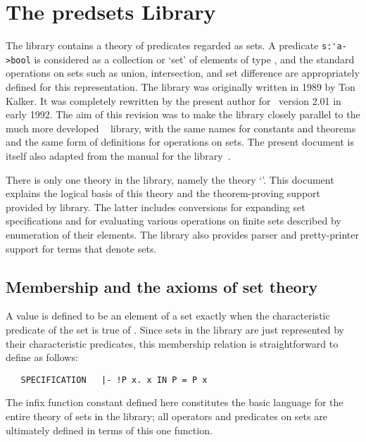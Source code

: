 \chapter{The pred{\und}sets Library}

The  library contains a theory of predicates regarded as sets.
A predicate {\small\verb!s:'a->bool!} is considered as a collection or `set' of
elements of type , and the standard operations on sets such as union,
intersection, and set difference are appropriately defined for this
representation.  The library was originally written in 1989 by Ton Kalker.  It
was completely rewritten by the present author for \HOL\ version 2.01 in early
1992.  The aim of this revision was to make the  library closely
parallel to the much more developed \HOL\  library, with the same
names for constants and theorems and the same form of definitions for
operations on sets.  The present document is itself also adapted from the
manual for the  library~\cite{melham}.

There is only one theory in the  library, namely the theory
`'. This document explains the logical basis of this theory and
the theorem-proving support provided by library.  The latter includes
conversions for expanding set specifications and for evaluating various
operations on finite sets described by enumeration of their elements.  The
library also provides parser and pretty-printer support for terms that denote
sets.

\section{Membership and the axioms of set theory}

A value  is defined to be an element of a set exactly when the
characteristic predicate of the set is true of . Since sets in the
 library are just represented by their characteristic
predicates, this membership relation is straightforward to define as follows:

\begin{hol}
\begin{verbatim}
   SPECIFICATION   |- !P x. x IN P = P x
\end{verbatim}\end{hol}

\noindent The infix function constant  defined here constitutes the
basic language for the entire theory of sets in the  library;
all operators and predicates on sets are ultimately defined in terms of this
one function.

